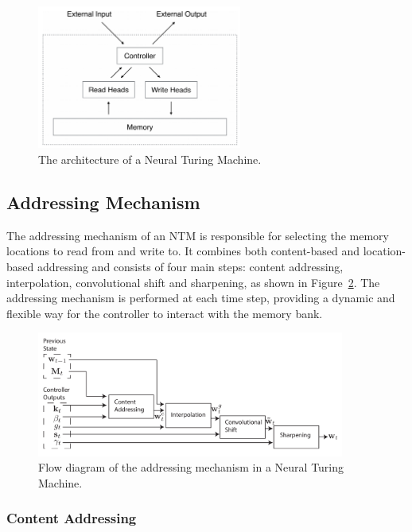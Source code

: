 \documentclass{article}
\newcommand{\reffig}[1]{Figure~\ref{#1}}
\begin{document}
\begin{figure}[htbp]
  \centering
  \includegraphics[width=0.6\textwidth]{NTM Structure.png}
  \caption{The architecture of a Neural Turing Machine.}
  \label{fig:ntm-structure}
\end{figure}


\subsection{Addressing Mechanism}
\label{sec:4.1}

The addressing mechanism of an NTM is responsible for selecting the memory locations to
read from and write to. It combines both content-based and location-based addressing and
consists of four main steps: content addressing, interpolation, convolutional shift and
sharpening, as shown in \reffig{fig:ntm-addressing}. The addressing mechanism is performed
at each time step, providing a dynamic and flexible way for the controller to interact
with the memory bank.

\begin{figure}[htbp]
  \centering
  \includegraphics[width=0.9\textwidth]{ntm_addr_4.png}
  \caption{Flow diagram of the addressing mechanism in a Neural Turing Machine.
    \cite{gravesNeuralTuringMachines2014}}
  \label{fig:ntm-addressing}
\end{figure}


\subsubsection{Content Addressing}
\label{sec:4.1.0}
\end{document}
